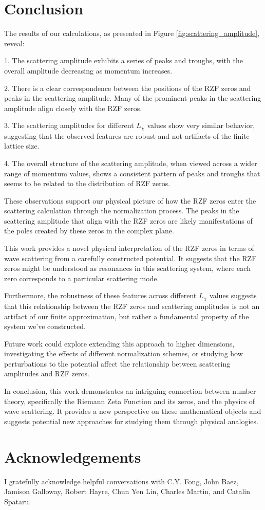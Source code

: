 \documentclass[11pt, oneside]{article}
\begin{document}
\section{Conclusion}

The results of our calculations, as presented in Figure \ref{fig:scattering_amplitude}, reveal:

1. The scattering amplitude exhibits a series of peaks and troughs, with the overall amplitude decreasing as momentum increases.

2. There is a clear correspondence between the positions of the RZF zeros and peaks in the scattering amplitude. Many of the prominent peaks in the scattering amplitude align closely with the RZF zeros.

3. The scattering amplitudes for different $L_\chi$ values show very similar behavior, suggesting that the observed features are robust and not artifacts of the finite lattice size.

4. The overall structure of the scattering amplitude, when viewed across a wider range of momentum values, shows a consistent pattern of peaks and troughs that seems to be related to the distribution of RZF zeros.

These observations support our physical picture of how the RZF zeros enter the scattering calculation through the normalization process. The peaks in the scattering amplitude that align with the RZF zeros are likely manifestations of the poles created by these zeros in the complex plane.

This work provides a novel physical interpretation of the RZF zeros in terms of wave scattering from a carefully constructed potential. It suggests that the RZF zeros might be understood as resonances in this scattering system, where each zero corresponds to a particular scattering mode.

Furthermore, the robustness of these features across different $L_\chi$ values suggests that this relationship between the RZF zeros and scattering amplitudes is not an artifact of our finite approximation, but rather a fundamental property of the system we've constructed.

Future work could explore extending this approach to higher dimensions, investigating the effects of different normalization schemes, or studying how perturbations to the potential affect the relationship between scattering amplitudes and RZF zeros.

In conclusion, this work demonstrates an intriguing connection between number theory, specifically the Riemann Zeta Function and its zeros, and the physics of wave scattering. It provides a new perspective on these mathematical objects and suggests potential new approaches for studying them through physical analogies.

\section{Acknowledgements}
I gratefully acknowledge helpful conversations with C.Y. Fong, John Baez, Jamison Galloway, Robert Hayre, Chun Yen Lin, Charles Martin, and Catalin Spataru.

\printbibliography
\end{document}
